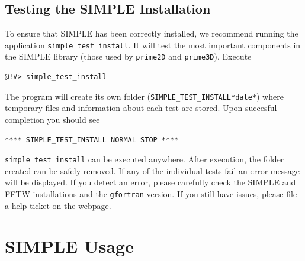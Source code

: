 \documentclass[a4paper,11pt]{article}
\newcommand{\prgname}[1]{\textcolor{NavyBlue}{\texttt{#1}}}
\begin{document}
\subsection{Testing the SIMPLE Installation}
To ensure that SIMPLE has been correctly installed, we recommend running the application \prgname{simple\_test\_install}. It will test the most important components in the SIMPLE library  (those used by \prgname{prime2D} and \prgname{prime3D}). Execute
\begin{verbatim}
@!#> simple_test_install 
\end{verbatim}
The program will create its own folder (\texttt{SIMPLE\_TEST\_INSTALL*date*}) where temporary files and information about each test are stored. Upon succesful completion you should see
\begin{verbatim}
**** SIMPLE_TEST_INSTALL NORMAL STOP ****
\end{verbatim}
\prgname{simple\_test\_install} can be executed anywhere. After execution, the folder created can be safely removed. If any of the individual tests fail an error message will be displayed. If you detect an error, please carefully check the SIMPLE and FFTW installations and the \texttt{gfortran} version. If you still have issues, please file a help ticket on the webpage.

\section{SIMPLE Usage}
\end{document}
